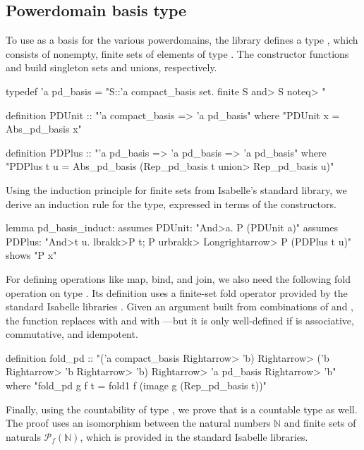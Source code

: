 \subsection{Powerdomain basis type}
\label{sec:pd-basis}

To use as a basis for the various powerdomains, the library defines a type , which consists of nonempty, finite sets of elements of type . The constructor functions  and  build singleton sets and unions, respectively.
%
\begin{isacode}
typedef 'a pd_basis = "{S::'a compact_basis set. finite S \<and> S \<noteq> {}}"
\end{isacode}
\unmedskip
{}
\begin{isacode}
definition PDUnit :: "'a compact_basis => 'a pd_basis"
  where "PDUnit x = Abs_pd_basis {x}"
\end{isacode}
\unmedskip
{}
\begin{isacode}
definition PDPlus :: "'a pd_basis => 'a pd_basis => 'a pd_basis"
  where "PDPlus t u = Abs_pd_basis (Rep_pd_basis t \<union> Rep_pd_basis u)"
\end{isacode}
%
Using the induction principle for finite sets from Isabelle's standard library, we derive an induction rule for the  type, expressed in terms of the constructors.
%
\begin{isacode}
lemma pd_basis_induct:
  assumes PDUnit: "\<And>a. P (PDUnit a)"
  assumes PDPlus: "\<And>t u. \<lbrakk>P t; P u\<rbrakk> \<Longrightarrow> P (PDPlus t u)"
  shows "P x"
\end{isacode}
%
For defining operations like map, bind, and join, we also need the following fold operation on type . Its definition uses a finite-set fold operator  provided by the standard Isabelle libraries \cite{Nipkow05}. Given an argument built from combinations of  and , the function  replaces  with  and  with ---but it is only well-defined if  is associative, commutative, and idempotent.
%
\begin{isacode}
definition fold_pd ::
    "('a compact_basis \<Rightarrow> 'b) \<Rightarrow> ('b \<Rightarrow> 'b \<Rightarrow> 'b) \<Rightarrow> 'a pd_basis \<Rightarrow> 'b"
  where "fold_pd g f t = fold1 f (image g (Rep_pd_basis t))"
\end{isacode}
%
Finally, using the countability of type , we prove that  is a countable type as well. The proof uses an isomorphism between the natural numbers $\mathbb{N}$ and finite sets of naturals $\mathcal{P}_f(\mathbb{N})$, which is provided in the standard Isabelle libraries.

